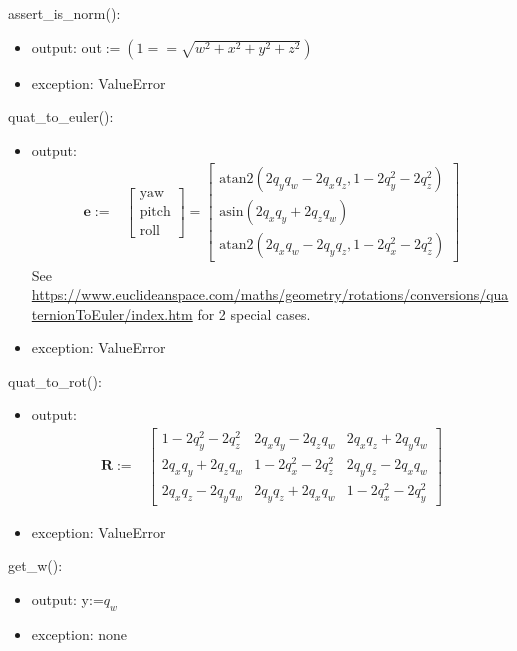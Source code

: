 \documentclass[12pt, titlepage]{article}
\begin{document}
\noindent assert\_is\_norm():
\begin{itemize}
\item output: out$:= (1 == \sqrt{w^2 + x^2 + y^2 + z^2})$
\item exception: ValueError
\end{itemize}

\noindent quat\_to\_euler():
\begin{itemize}
\item output: \begin{align*}
  \mathbf{e} :=& \begin{bmatrix}
    \text{yaw} \\ \text{pitch} \\ \text{roll}
  \end{bmatrix} =
  \begin{bmatrix}
    \text{atan2}(2 q_y q_w - 2 q_x q_z, 1 - 2 q_y^2 - 2 q_z ^ 2) \\
    \text{asin}(2 q_x q_y + 2 q_z q_w) \\
    \text{atan2}(2 q_x q_w - 2 q_y q_z, 1 - 2 q_x^2 - 2 q_z ^2)
  \end{bmatrix}
\end{align*}
See \url{https://www.euclideanspace.com/maths/geometry/rotations/conversions/quaternionToEuler/index.htm} for 2 special cases.
\item exception: ValueError
\end{itemize}

\noindent quat\_to\_rot():
\begin{itemize}
\item output: \begin{align*}
  \mathbf{R}:= & \begin{bmatrix}
    1- 2 q_y^2 - 2 q_z^2 & 2 q_x q_y - 2 q_z q_w & 2 q_x q_z + 2 q_y q_w \\
    2 q_x q_y + 2 q_z q_w & 1 -2 q_x^2 - 2 q_z^2 & 2 q_y q_z - 2 q_x q_w \\
    2 q_x q_z - 2 q_y q_w & 2 q_y q_z + 2 q_x q_w & 1 -2 q_x^2 - 2 q_y ^2
  \end{bmatrix}
\end{align*}
\item exception: ValueError
\end{itemize}

\noindent get\_w():
\begin{itemize}
\item output: y:=$q_w$
\item exception: none
\end{itemize}
\end{document}
